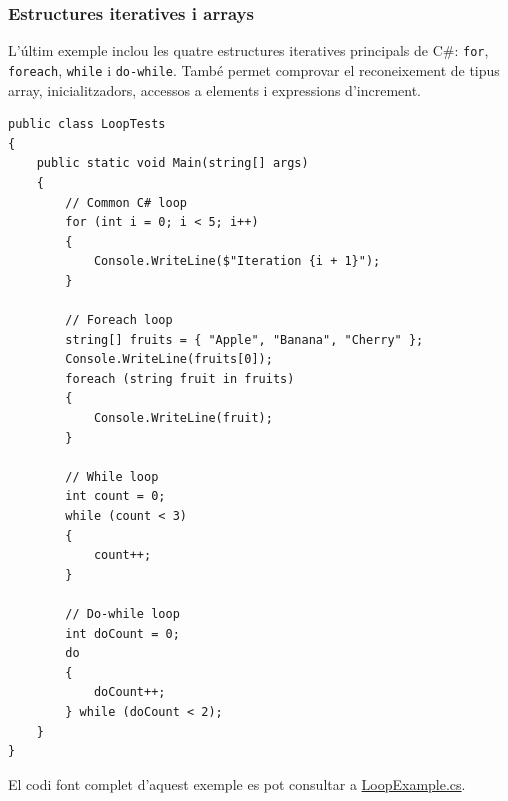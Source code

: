 \subsubsection*{Estructures iteratives i arrays}
\label{sec:parser-loops-arrays}

L'últim exemple inclou les quatre estructures iteratives principals de C\#:
\texttt{for}, \texttt{foreach}, \texttt{while} i \texttt{do-while}. També permet
comprovar el reconeixement de tipus array, inicialitzadors, accessos a elements i
expressions d'increment.

\begin{lstlisting}[style=code,
    caption={Codi font de l'exemple d'estructures iteratives i arrays},
    label={lst:loops-source}]
public class LoopTests
{
    public static void Main(string[] args)
    {
        // Common C# loop
        for (int i = 0; i < 5; i++)
        {
            Console.WriteLine($"Iteration {i + 1}");
        }

        // Foreach loop
        string[] fruits = { "Apple", "Banana", "Cherry" };
        Console.WriteLine(fruits[0]);
        foreach (string fruit in fruits)
        {
            Console.WriteLine(fruit);
        }

        // While loop
        int count = 0;
        while (count < 3)
        {
            count++;
        }

        // Do-while loop
        int doCount = 0;
        do
        {
            doCount++;
        } while (doCount < 2);
    }
}
\end{lstlisting}

El codi font complet d'aquest exemple es pot consultar
a \href{https://github.com/PauDiazM/static-code-analysis-tfg/blob/main/code_samples/examples/LoopExample.cs}{LoopExample.cs}.

